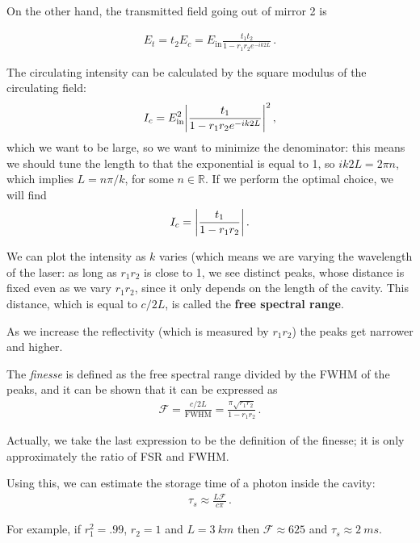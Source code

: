 \documentclass[main.tex]{subfiles}
\begin{document}
On the other hand, the transmitted field going out of mirror 2 is 

\begin{align}
E_{t} = t_2 E_c = E _{\text{in}} \frac{t_1 t_2 }{1 - r_1 r_2 e^{-ik2L}}
\,.
\end{align}

The circulating intensity can be calculated by the square modulus of the circulating field: 
%
\begin{align}
I_{c} = E^2 _{\text{in}} \abs{\frac{t_1 }{1 - r_1 r_2 e^{-ik2L}}}^2
\,,
\end{align}
%
which we want to be large, so we want to minimize the denominator: this means we should tune the length to that the exponential is equal to 1, so \(ik2L = 2 \pi n\), which implies \(L = n \pi / k\), for some \(n \in \mathbb{R}\). 
If we perform the optimal choice, we will find 
%
\begin{align}
I_c = \abs{\frac{t_1}{1 - r_1 r_2 }}
\,.
\end{align}

We can plot the intensity as \(k\) varies (which means we are varying the wavelength of the laser: as long as \(r_1 r_2 \) is close to 1, we see distinct peaks, whose distance is fixed even as we vary \(r_1 r_2 \), since it only depends on the length of the cavity.
This distance, which is equal to \(c / 2L\), is called the \textbf{free spectral range}.

As we increase the reflectivity (which is measured by \(r_1 r_2 \)) the peaks get narrower and higher. 


The \emph{finesse} is defined as the free spectral range divided by the FWHM of the peaks, and it can be shown that it can be expressed as
%
\begin{align}
\mathcal{F} = \frac{c / 2L}{\text{FWHM}} =  \frac{\pi \sqrt{r_1 r_2 }}{1 - r_1 r_2 }
\,.
\end{align}

Actually, we take the last expression to be the definition of the finesse; it is only approximately the ratio of FSR and FWHM. 

Using this, we can estimate the storage time of a photon inside the cavity: 
%
\begin{align}
\tau_{s} \approx \frac{L \mathcal{F}}{c \pi }
\,.
\end{align}

For example, if \(r_1^2= \num{.99}\), \(r_2 = 1\) and \(L = \SI{3}{km}\) then \(\mathcal{F} \approx 625\) and \(\tau_{s} \approx \SI{2}{ms}\). 
\end{document}
